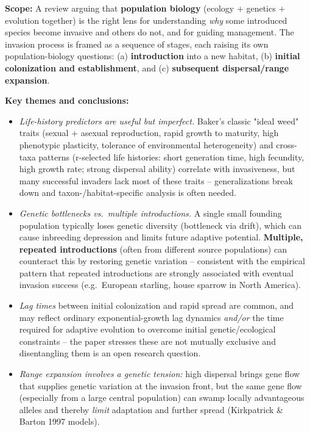 \documentclass[11pt,a4paper]{article}
\begin{document}
\begin{papbox}[title={Paper Summary: Sakai, Allendorf, Holt et al. (2001), \textit{Annu. Rev. Ecol. Syst.} 32:305--332 -- ``The Population Biology of Invasive Species''}]
\textbf{Scope:} A review arguing that \textbf{population biology} (ecology $+$ genetics $+$ evolution together) is the right lens for understanding \emph{why} some introduced species become invasive and others do not, and for guiding management. The invasion process is framed as a sequence of stages, each raising its own population-biology questions: (a) \textbf{introduction} into a new habitat, (b) \textbf{initial colonization and establishment}, and (c) \textbf{subsequent dispersal/range expansion}.

\textbf{Key themes and conclusions:}
\begin{itemize}[leftmargin=1.3em,nosep]
\item \emph{Life-history predictors are useful but imperfect.} Baker's classic "ideal weed" traits (sexual + asexual reproduction, rapid growth to maturity, high phenotypic plasticity, tolerance of environmental heterogeneity) and cross-taxa patterns (r-selected life histories: short generation time, high fecundity, high growth rate; strong dispersal ability) correlate with invasiveness, but many successful invaders lack most of these traits -- generalizations break down and taxon-/habitat-specific analysis is often needed.
\item \emph{Genetic bottlenecks vs.\ multiple introductions.} A single small founding population typically loses genetic diversity (bottleneck via drift), which can cause inbreeding depression and limits future adaptive potential. \textbf{Multiple, repeated introductions} (often from different source populations) can counteract this by restoring genetic variation -- consistent with the empirical pattern that repeated introductions are strongly associated with eventual invasion success (e.g.\ European starling, house sparrow in North America).
\item \emph{Lag times} between initial colonization and rapid spread are common, and may reflect ordinary exponential-growth lag dynamics \emph{and/or} the time required for adaptive evolution to overcome initial genetic/ecological constraints -- the paper stresses these are not mutually exclusive and disentangling them is an open research question.
\item \emph{Range expansion involves a genetic tension:} high dispersal brings gene flow that supplies genetic variation at the invasion front, but the same gene flow (especially from a large central population) can swamp locally advantageous alleles and thereby \emph{limit} adaptation and further spread (Kirkpatrick \& Barton 1997 models).

\end{itemize}
\end{papbox}
\end{document}
